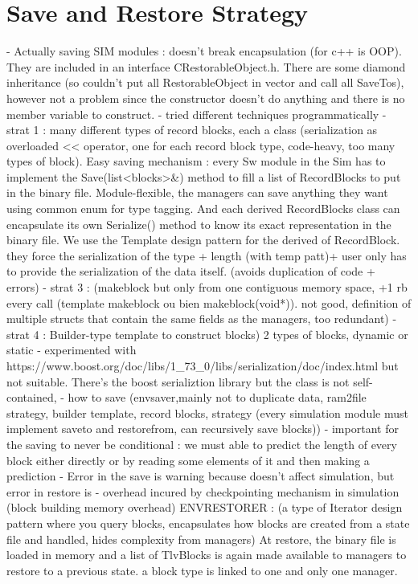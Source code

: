 {\section{Save and Restore Strategy}
- Actually saving SIM modules : doesn't break encapsulation (for c++ is OOP). They are included in an interface CRestorableObject.h. There are some diamond inheritance (so couldn't put all RestorableObject in vector and call all SaveTos), however not a problem since the constructor doesn't do anything and there is no member variable to construct.
- tried different techniques programmatically
- strat 1 : many different types of record blocks, each a class  (serialization as overloaded << operator, one for each record block type, code-heavy, too many types of block). Easy saving mechanism : every Sw module in the Sim has to implement the Save(list<blocks>&) method to fill a list of RecordBlocks to put in the binary file. Module-flexible, the managers can save anything they want using common enum for type tagging. And each derived RecordBlocks class can encapsulate its own Serialize() method to know its exact representation in the binary file. We use the Template design pattern for the derived of RecordBlock. they force the serialization of the type + length (with temp patt)+ user only has to provide the serialization of the data itself. (avoids duplication of code + errors)
- strat 3 : (makeblock but only from one contiguous memory space, +1 rb every call (template makeblock ou bien makeblock(void*)). not good, definition of multiple structs that contain the same fields as the managers, too redundant)
- strat 4 : Builder-type template to construct blocks) 2 types of blocks, dynamic or static
- experimented with https://www.boost.org/doc/libs/1_73_0/libs/serialization/doc/index.html but not suitable. There's the boost serializtion library but the class is not self-contained, 
- how to save (envsaver,mainly not to duplicate data, ram2file strategy, builder template, record blocks, strategy (every simulation module must implement saveto and restorefrom, can recursively save blocks))
- important for the saving to never be conditional : we must able to predict the length of every block either directly or by reading some elements of it and then making a prediction
- Error in the save is warning because doesn't affect simulation, but error in restore is 
- overhead incured by checkpointing mechanism in simulation (block building memory overhead)
ENVRESTORER : (a type of Iterator design pattern where you query blocks, encapsulates how blocks are created from a state file and handled, hides complexity from managers) At restore, the binary file is loaded in memory and a list of TlvBlocks is again made available to managers to restore to a previous state. a block type is linked to one and only one manager. 

}
